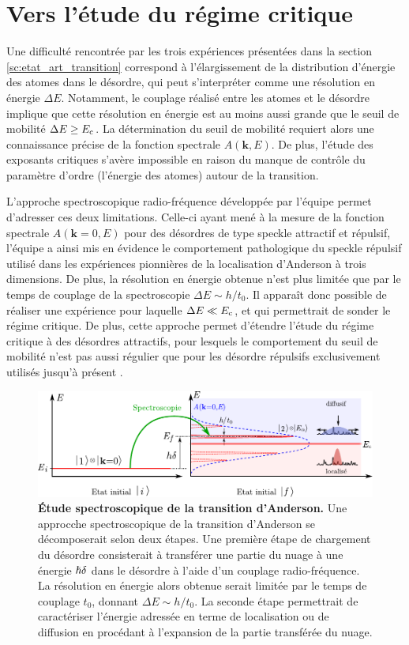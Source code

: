 \section{Vers l'étude du régime critique}
Une difficulté rencontrée par les trois expériences présentées dans la section \ref{sc:etat_art_transition} correspond à l'élargissement de la distribution d'énergie des atomes dans le désordre, qui peut s'interpréter comme une résolution en énergie $\Delta E$. Notamment, le couplage réalisé entre les atomes et le désordre implique que cette résolution en énergie est au moins aussi grande que le seuil de mobilité $\Delta E \geq E_{\mathrm{c}}$. La détermination du seuil de mobilité requiert alors une connaissance précise de la fonction spectrale $A(\mathbf{k},E)$. De plus, l'étude des exposants critiques s'avère impossible en raison du manque de contrôle du paramètre d'ordre (l'énergie des atomes) autour de la transition. 

L'approche spectroscopique radio-fréquence développée par l'équipe permet d'adresser ces deux limitations. Celle-ci ayant mené à la mesure de la fonction spectrale $A(\mathbf{k}=0,E)$ pour des désordres de type speckle attractif et répulsif, l'équipe a ainsi mis en évidence le comportement pathologique du speckle répulsif utilisé dans les expériences pionnières de la localisation d'Anderson à trois dimensions. De plus, la résolution en énergie obtenue n'est plus limitée que par le temps de couplage de la spectroscopie $\Delta E \sim h/t_0$. Il apparaît donc possible de réaliser une expérience pour laquelle $\Delta E \ll E_{\mathrm{c}}$, et qui permettrait de sonder le régime critique. De plus, cette approche permet d'étendre l'étude du régime critique à des désordres attractifs, pour lesquels le comportement du seuil de mobilité n'est pas aussi régulier que pour les désordre répulsifs exclusivement utilisés jusqu'à présent \citep{delande2014mobility}.

\begin{figure}
\centering
\includegraphics[width=\textwidth]{Fig/Conclusion/spectro_transition_anderson.pdf}
\caption{\textbf{Étude spectroscopique de la transition d'Anderson.} Une approcche spectroscopique de la transition d'Anderson se décomposerait selon deux étapes. Une première étape de chargement du désordre consisterait à transférer une partie du nuage à une énergie $\hslash\delta$ dans le désordre à l'aide d'un couplage radio-fréquence. La résolution en énergie alors obtenue serait limitée par le temps de couplage $t_0$, donnant $\Delta E \sim h/t_0$. La seconde étape permettrait de caractériser l'énergie adressée en terme de localisation ou de diffusion en procédant à l'expansion de la partie transférée du nuage.}
\label{fig:spectro_transition_anderson}
\end{figure}

